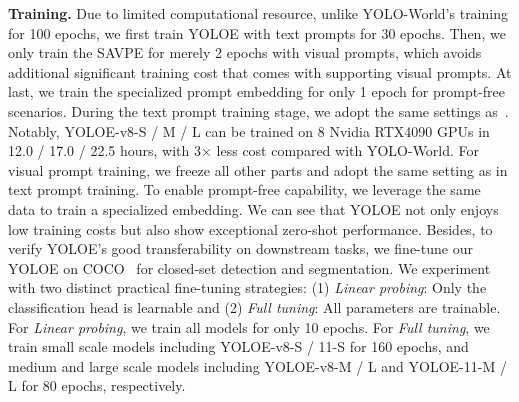 \documentclass[10pt,twocolumn,letterpaper]{article}
\begin{document}
\textbf{Training.} Due to limited computational resource, unlike YOLO-World's training for 100 epochs, we first train YOLOE with text prompts for 30 epochs. Then, we only train the SAVPE for merely 2 epochs with visual prompts, which avoids additional significant training cost that comes with supporting visual prompts. At last, we train the specialized prompt embedding for only 1 epoch for prompt-free scenarios. During the text prompt training stage, we adopt the same settings as~\cite{cheng2024yoloworld}.
Notably, YOLOE-v8-S / M / L can be trained on 8 Nvidia RTX4090 GPUs in 12.0 / 17.0 / 22.5 hours, with 3$\times$ less cost compared with YOLO-World. For visual prompt training, we freeze all other parts and adopt the same setting as in text prompt training. To enable prompt-free capability, we leverage the same data to train a specialized embedding. We can see that YOLOE not only enjoys low training costs but also show exceptional zero-shot performance. Besides, to verify YOLOE's good transferability on downstream tasks, we fine-tune our YOLOE on COCO~\cite{lin2014mscoco} for closed-set detection and segmentation. We experiment with two distinct practical fine-tuning strategies: (1) \textit{Linear probing}: Only the classification head is learnable and (2) \textit{Full tuning}: All parameters are trainable. 
For \textit{Linear probing}, we train all models for only 10 epochs. For \textit{Full tuning}, we train small scale models including YOLOE-v8-S / 11-S for 160 epochs, and medium and large scale models including YOLOE-v8-M / L and YOLOE-11-M / L for 80 epochs, respectively.
\end{document}
